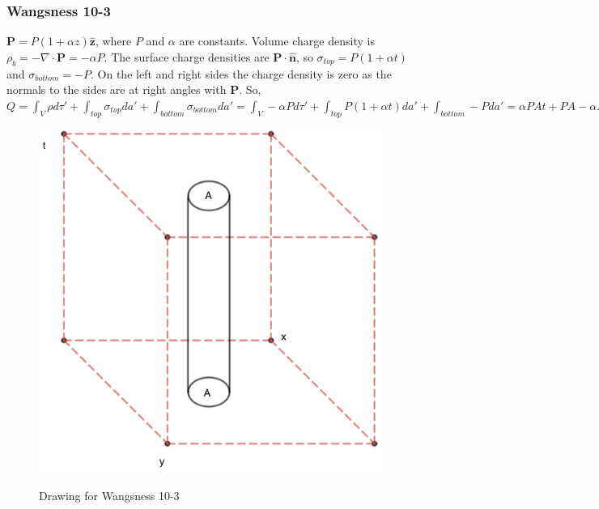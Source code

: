 \documentclass{article}
\theoremstyle{mystyle}
\begin{document}
\subsubsection{Wangsness 10-3}
$\mathbf{P}= P(1+\alpha z)\hat{\mathbf{z}}$, where $P$ and $\alpha$ are constants. Volume charge density is $\rho_{b} = -\nabla \cdot \mathbf{P} = -\alpha P$. The surface charge densities are $\mathbf{P}\cdot \hat{\mathbf{n}}$, so $\sigma_{top} = P(1+\alpha t)$ and $\sigma_{bottom} = -P$. On the left and right sides the charge density is zero as the normals to the sides are at right angles with $\mathbf{P}$. So, $Q = \int_{V} \rho d\tau' + \int_{top} \sigma_{top} da' + \int_{bottom} \sigma_{bottom} da' = \int_{V}-\alpha P d\tau' + \int_{top}P(1+\alpha t) da' + \int_{bottom} - Pda' = \alpha PAt + PA - \alpha PA t - PA = 0$
\begin{figure}[htbp]
    \centering
    {\includegraphics[scale=0.4]{10-3.png}}
    \caption{Drawing for Wangsness 10-3}
\end{figure}
\end{document}
